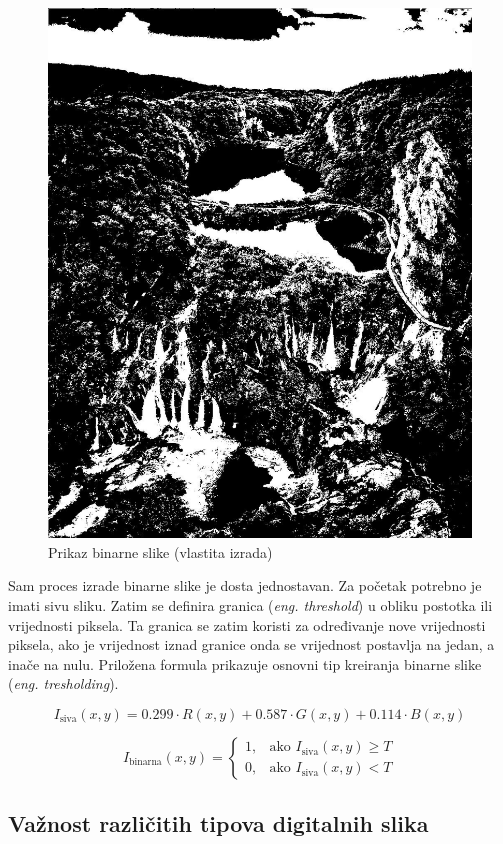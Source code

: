\documentclass{foi}
\begin{document}
\begin{figure}[H]
    \centering
    \includegraphics[width=0.75\linewidth]{slike/Binary.jpeg}
    \caption{Prikaz binarne slike (vlastita izrada)}
\end{figure}

Sam proces izrade binarne slike je dosta jednostavan. Za početak potrebno je imati sivu sliku. Zatim se definira granica (\textit{eng. threshold}) u obliku postotka ili vrijednosti piksela. Ta granica se zatim koristi za određivanje nove vrijednosti piksela, ako je vrijednost iznad granice onda se vrijednost postavlja na jedan, a inače na nulu. Priložena formula prikazuje osnovni tip kreiranja binarne slike (\textit{eng. tresholding}).

{\large
    \[
I_{\text{siva}}(x, y) = 0.299 \cdot R(x, y) + 0.587 \cdot G(x, y) + 0.114 \cdot B(x, y)
\]

\[
I_{\text{binarna}}(x, y) =
\begin{cases}
1, & \text{ako } I_{\text{siva}}(x, y) \geq T \\
0, & \text{ako } I_{\text{siva}}(x, y) < T
\end{cases}
\]}


\subsection{Važnost različitih tipova digitalnih slika}
\end{document}
